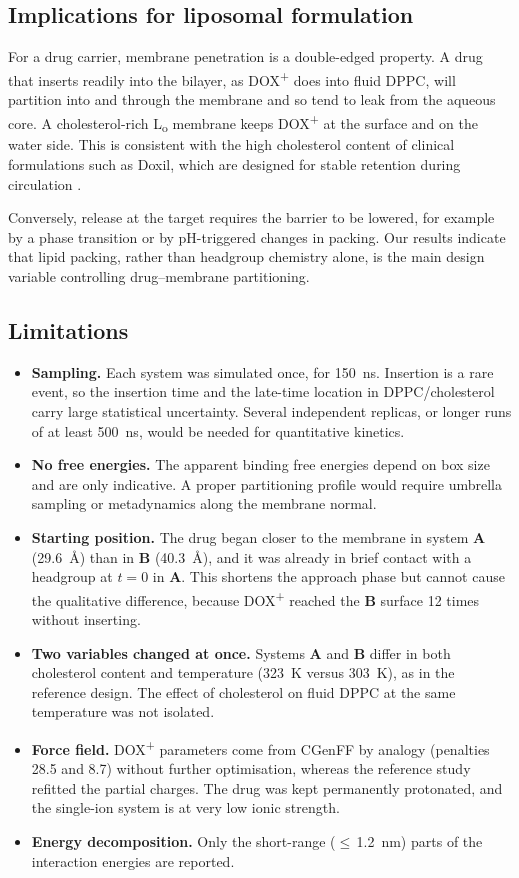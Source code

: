 \documentclass[11pt,a4paper]{article}
\newcommand{\dox}{DOX\textsuperscript{+}}
\newcommand{\sysA}{\textcolor{sysA}{\textbf{A}}}
\newcommand{\sysB}{\textcolor{sysB}{\textbf{B}}}
\newcommand{\Lo}{L\textsubscript{o}}
\begin{document}
\subsection{Implications for liposomal formulation}
For a drug carrier, membrane penetration is a double-edged property. A drug that inserts readily into the
bilayer, as \dox{} does into fluid DPPC, will partition into and through the membrane and so tend to leak
from the aqueous core. A cholesterol-rich \Lo{} membrane keeps \dox{} at the surface and on the water
side. This is consistent with the high cholesterol content of clinical formulations such as Doxil, which
are designed for stable retention during circulation \cite{barenholz2012}.

Conversely, release at the target requires the barrier to be lowered, for example by a phase transition
or by pH-triggered changes in packing. Our results indicate that lipid packing, rather than headgroup
chemistry alone, is the main design variable controlling drug--membrane partitioning.

\subsection{Limitations}
\begin{itemize}
  \item \textbf{Sampling.} Each system was simulated once, for \SI{150}{ns}. Insertion is a rare event,
        so the insertion time and the late-time location in DPPC/cholesterol carry large statistical
        uncertainty. Several independent replicas, or longer runs of at least \SI{500}{ns}, would be
        needed for quantitative kinetics.
  \item \textbf{No free energies.} The apparent binding free energies depend on box size and are only
        indicative. A proper partitioning profile would require umbrella sampling or metadynamics along
        the membrane normal.
  \item \textbf{Starting position.} The drug began closer to the membrane in system \sysA{}
        (\SI{29.6}{\angstrom}) than in \sysB{} (\SI{40.3}{\angstrom}), and it was already in brief
        contact with a headgroup at $t=0$ in \sysA{}. This shortens the approach phase but cannot cause
        the qualitative difference, because \dox{} reached the \sysB{} surface 12 times without
        inserting.
  \item \textbf{Two variables changed at once.} Systems \sysA{} and \sysB{} differ in both
        cholesterol content and temperature (\SI{323}{K} versus \SI{303}{K}), as in the reference design.
        The effect of cholesterol on fluid DPPC at the same temperature was not isolated.
  \item \textbf{Force field.} \dox{} parameters come from CGenFF by analogy (penalties 28.5 and 8.7)
        without further optimisation, whereas the reference study refitted the partial charges. The
        drug was kept permanently protonated, and the single-ion system is at very low ionic strength.
  \item \textbf{Energy decomposition.} Only the short-range ($\le$\,\SI{1.2}{nm}) parts of the interaction
        energies are reported.
\end{itemize}
\end{document}
